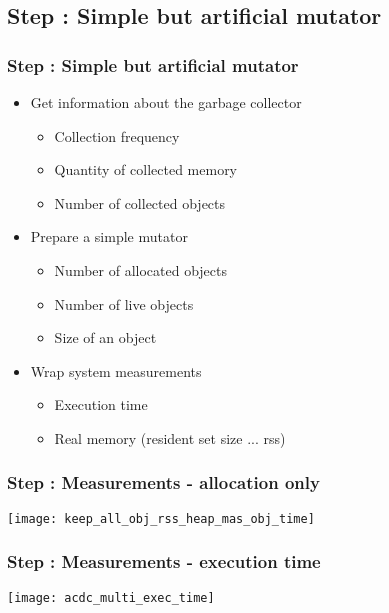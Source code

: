 \subsection{Step \theStepCounter: Simple but artificial mutator}
\begin{frame}
	\frametitle{Step \theStepCounter: Simple but artificial mutator}
	\begin{itemize}
		\item Get information about the garbage collector
		\begin{itemize}
			\item Collection frequency %
			\item Quantity of collected memory
			\item Number of collected objects
		\end{itemize}
		
		\smallskip
		\pause
			
		\item Prepare a simple mutator
		\begin{itemize}
			\item Number of allocated objects
			\item Number of live objects
			\item Size of an object
		\end{itemize}
			
		\smallskip
		\pause
			
		\item Wrap system measurements
		\begin{itemize}
			\item Execution time
			\item Real memory (resident set size ... rss) 
		\end{itemize}
	\end{itemize}
\end{frame}
\begin{frame} 
	\frametitle{Step \theStepCounter: Measurements - allocation only}
	\begin{center}
		\texttt{[image: keep\_all\_obj\_rss\_heap\_mas\_obj\_time]}
	\end{center}
\end{frame}
\begin{frame} 
	\frametitle{Step \theStepCounter: Measurements - execution time}
	\begin{center}
		\texttt{[image: acdc\_multi\_exec\_time]}
	\end{center}
\end{frame}
	
